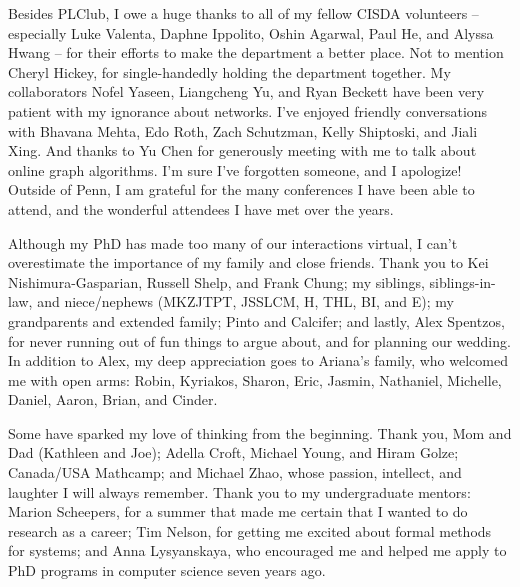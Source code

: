 Besides PLClub, I owe a huge thanks to all of my fellow CISDA volunteers -- especially Luke Valenta, Daphne Ippolito, Oshin Agarwal, Paul He, and Alyssa Hwang -- for their efforts to make the department a better place.
Not to mention Cheryl Hickey, for single-handedly holding the department together.
My collaborators Nofel Yaseen, Liangcheng Yu, and Ryan Beckett have been very patient with my ignorance about networks.
I've enjoyed friendly conversations with Bhavana Mehta, Edo Roth, Zach Schutzman, Kelly Shiptoski, and Jiali Xing.
And thanks to Yu Chen for generously meeting with me to talk about online graph algorithms.
I'm sure I've forgotten someone, and I apologize!
Outside of Penn, I am grateful for the many conferences I have been able to attend, and the wonderful attendees I have met over the years.

Although my PhD has made too many of our interactions virtual, I can't overestimate the importance of my family and close friends.
Thank you to Kei Nishimura-Gasparian, Russell Shelp, and Frank Chung; my siblings, siblings-in-law, and niece/nephews (MKZJTPT, JSSLCM, H, THL, BI, and E); my grandparents and extended family; Pinto and Calcifer;
and lastly, Alex Spentzos, for never running out of fun things to argue about, and for planning our wedding. In addition to Alex, my deep appreciation goes to Ariana's family, who welcomed me with open arms: Robin, Kyriakos, Sharon, Eric, Jasmin, Nathaniel, Michelle, Daniel, Aaron, Brian, and Cinder.

Some have sparked my love of thinking from the beginning.
Thank you, Mom and Dad (Kathleen and Joe);
Adella Croft, Michael Young, and Hiram Golze;
Canada/USA Mathcamp;
and Michael Zhao,
whose passion, intellect, and laughter I will always remember.
Thank you to my undergraduate mentors: Marion Scheepers, for a summer that made me certain that I wanted to do research as a career;
Tim Nelson, for getting me excited about formal methods for systems;
and Anna Lysyanskaya, who encouraged me and helped me apply to PhD programs in computer science seven years ago.
